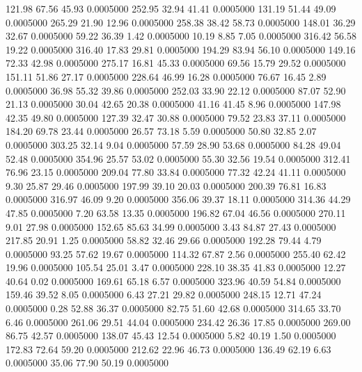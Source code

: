  121.98   67.56   45.93   0.0005000
 252.95   32.94   41.41   0.0005000
 131.19   51.44   49.09   0.0005000
 265.29   21.90   12.96   0.0005000
 258.38   38.42   58.73   0.0005000
 148.01   36.29   32.67   0.0005000
  59.22   36.39    1.42   0.0005000
  10.19    8.85    7.05   0.0005000
 316.42   56.58   19.22   0.0005000
 316.40   17.83   29.81   0.0005000
 194.29   83.94   56.10   0.0005000
 149.16   72.33   42.98   0.0005000
 275.17   16.81   45.33   0.0005000
  69.56   15.79   29.52   0.0005000
 151.11   51.86   27.17   0.0005000
 228.64   46.99   16.28   0.0005000
  76.67   16.45    2.89   0.0005000
  36.98   55.32   39.86   0.0005000
 252.03   33.90   22.12   0.0005000
  87.07   52.90   21.13   0.0005000
  30.04   42.65   20.38   0.0005000
  41.16   41.45    8.96   0.0005000
 147.98   42.35   49.80   0.0005000
 127.39   32.47   30.88   0.0005000
  79.52   23.83   37.11   0.0005000
 184.20   69.78   23.44   0.0005000
  26.57   73.18    5.59   0.0005000
  50.80   32.85    2.07   0.0005000
 303.25   32.14    9.04   0.0005000
  57.59   28.90   53.68   0.0005000
  84.28   49.04   52.48   0.0005000
 354.96   25.57   53.02   0.0005000
  55.30   32.56   19.54   0.0005000
 312.41   76.96   23.15   0.0005000
 209.04   77.80   33.84   0.0005000
  77.32   42.24   41.11   0.0005000
   9.30   25.87   29.46   0.0005000
 197.99   39.10   20.03   0.0005000
 200.39   76.81   16.83   0.0005000
 316.97   46.09    9.20   0.0005000
 356.06   39.37   18.11   0.0005000
 314.36   44.29   47.85   0.0005000
   7.20   63.58   13.35   0.0005000
 196.82   67.04   46.56   0.0005000
 270.11    9.01   27.98   0.0005000
 152.65   85.63   34.99   0.0005000
   3.43   84.87   27.43   0.0005000
 217.85   20.91    1.25   0.0005000
  58.82   32.46   29.66   0.0005000
 192.28   79.44    4.79   0.0005000
  93.25   57.62   19.67   0.0005000
 114.32   67.87    2.56   0.0005000
 255.40   62.42   19.96   0.0005000
 105.54   25.01    3.47   0.0005000
 228.10   38.35   41.83   0.0005000
  12.27   40.64    0.02   0.0005000
 169.61   65.18    6.57   0.0005000
 323.96   40.59   54.84   0.0005000
 159.46   39.52    8.05   0.0005000
   6.43   27.21   29.82   0.0005000
 248.15   12.71   47.24   0.0005000
   0.28   52.88   36.37   0.0005000
  82.75   51.60   42.68   0.0005000
 314.65   33.70    6.46   0.0005000
 261.06   29.51   44.04   0.0005000
 234.42   26.36   17.85   0.0005000
 269.00   86.75   42.57   0.0005000
 138.07   45.43   12.54   0.0005000
   5.82   40.19    1.50   0.0005000
 172.83   72.64   59.20   0.0005000
 212.62   22.96   46.73   0.0005000
 136.49   62.19    6.63   0.0005000
  35.06   77.90   50.19   0.0005000
